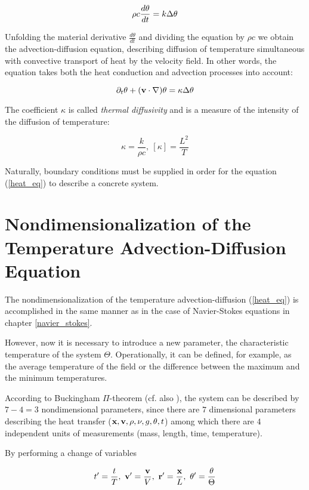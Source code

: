 $$ \rho c\frac{d\theta}{dt} = k \Delta\theta $$

Unfolding the material derivative $\frac{d\theta}{dt}$ and dividing the equation by $\rho c$ we obtain the advection-diffusion equation, describing  diffusion of temperature simultaneous with convective transport of heat by the velocity field. In other words, the equation takes both the heat conduction and advection processes into account:

\begin{equation} \label{heat_eq}
\partial_t\theta + (\mathbf{v} \cdot \nabla)\theta = \kappa \Delta\theta 
\end{equation}


The coefficient $\kappa$ is called \emph{thermal diffusivity} and is a measure of the intensity of the diffusion of temperature:

$$ \kappa = \frac{k}{\rho c}, ~ [\kappa] = \frac{L^2}{T}$$

Naturally, boundary conditions must be supplied in order for the equation (\ref{heat_eq}) to describe a concrete system.

\section{Nondimensionalization of the Temperature Advection-Diffusion Equation}

The nondimensionalization of the temperature advection-diffusion (\ref{heat_eq}) is accomplished in the same manner as in the case of Navier-Stokes equations in chapter \ref{navier_stokes}. 

However, now it is necessary to introduce a new parameter, the characteristic temperature of the system $\Theta$. Operationally, it can be defined, for example, as the average temperature of the field or the difference between the maximum and the minimum temperatures.

According to Buckingham $\Pi$-theorem \cite{barenblatt1} (cf. also ), the system can be described by $7 - 4 = 3$ nondimensional parameters, since there are $7$ dimensional parameters describing the heat transfer ($\mathbf{x}, \mathbf{v}, \rho, \nu, g, \theta, t$) among which there are $4$ independent units of measurements (mass, length, time, temperature).

By performing a change of variables 

$$ t^{\prime}  = \frac{t}{T},~ \mathbf{v^{\prime}} = \frac{\mathbf{v}}{V},~ \mathbf{r^{\prime}} = \frac{\mathbf{x}}{L},~ \theta^{\prime} = \frac{\theta}{\Theta} $$ 


